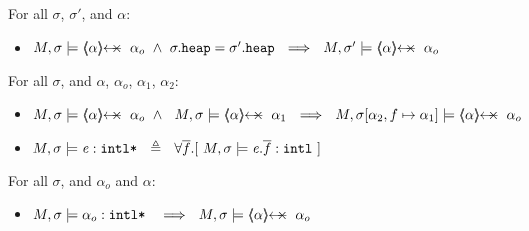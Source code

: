   {
 \begin{lemma} For all $\sigma$, $\sigma'$, and $\alpha$:
\begin{itemize}
\item
$  M, \sigma  \models    { \protectedFrom \alpha {\alpha_o}}  \ \wedge\   \sigma.\prg{heap}= \sigma'.\prg{heap} \ \ \Longrightarrow\ \  M, \sigma' \models      { \protectedFrom \alpha {\alpha_o}} $
\end{itemize}
\end{lemma}
}

{
 \begin{lemma} For all $\sigma$,  and $\alpha$, $\alpha_o$, $\alpha_1$, $\alpha_2$:
 \label{l:prtFrom}
\begin{itemize}
\item
$ M, \sigma  \models    {\protectedFrom \alpha  {\alpha_o}}  \  \wedge \ \  M, \sigma  \models    {\protectedFrom \alpha  {\alpha_1}}    \   \ 
\Longrightarrow\ \ M, \sigma[\alpha_2,f \mapsto \alpha_1] \models  \protectedFrom\alpha   {\alpha_o}$
\end{itemize}
\end{lemma}
}

{
\begin{definition}
\begin{itemize}
\item
$M, \sigma \models \mathit{e}:\mbox{\normalfont{\texttt{intl*}}} \ \ \triangleq \ \ \forall \overline{f}.[\  M, \sigma \models \mathit{e}.\overline{f}:\mbox{\normalfont{\texttt{intl}}}\ ]$
\end{itemize}
\end{definition}
}

{
 \begin{lemma} For all $\sigma$, and $\alpha_o$ and $\alpha$:
\begin{itemize}
\item
$M, \sigma \models \internalPaths{\alpha_o}  \    \ \ \Longrightarrow\ \ M, \sigma \models {\protectedFrom \alpha {\alpha_o}}$
\end{itemize}
\end{lemma}
}

